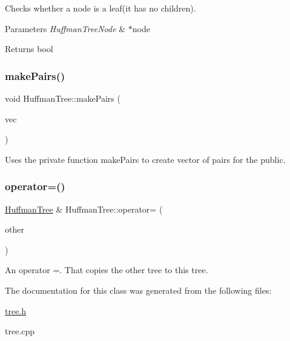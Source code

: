 Checks whether a node is a leaf(it has no children). 
\begin{DoxyParams}{Parameters}
{\em Huffman\+Tree\+Node} & $\ast$node \\
\hline
\end{DoxyParams}
\begin{DoxyReturn}{Returns}
bool 
\end{DoxyReturn}
\mbox{\label{class_huffman_tree_aad4e7b29b81e1b64d1eb48a3bd70747f}} 
\subsubsection{\texorpdfstring{make\+Pairs()}{makePairs()}}
{\footnotesize\ttfamily void Huffman\+Tree\+::make\+Pairs (\begin{DoxyParamCaption}\item[{std\+::vector$<$ std\+::pair$<$ char, std\+::string $>$$>$ \&}]{vec }\end{DoxyParamCaption})}

Uses the private function make\+Pairs to create vector of pairs for the public. \mbox{\label{class_huffman_tree_a1274cfce54e9bb66af77bff91aa71411}} 
\subsubsection{\texorpdfstring{operator=()}{operator=()}}
{\footnotesize\ttfamily \hyperlink{class_huffman_tree}{Huffman\+Tree} \& Huffman\+Tree\+::operator= (\begin{DoxyParamCaption}\item[{const \hyperlink{class_huffman_tree}{Huffman\+Tree} \&}]{other }\end{DoxyParamCaption})}

An operator =. That copies the \textquotesingle{}other\textquotesingle{} tree to \textquotesingle{}this\textquotesingle{} tree. 

The documentation for this class was generated from the following files\+:\begin{DoxyCompactItemize}
\item 
\hyperlink{tree_8h}{tree.\+h}\item 
tree.\+cpp\end{DoxyCompactItemize}
